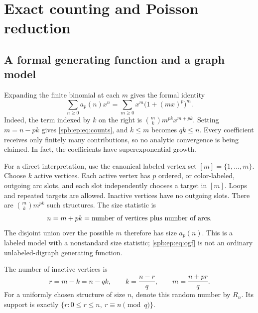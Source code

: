 \section{Exact counting and Poisson reduction}
\label{spb:ep:sec:exact}
\subsection{A formal generating function and a graph model}
Expanding the finite binomial at each $m$ gives the formal identity
\begin{equation}\label{spb:ep:eq:ogf}
 \sum_{n\ge0}a_p(n)x^n
       =\sum_{m\ge0}x^m\bigl(1+(mx)^p\bigr)^m.
\end{equation}
Indeed, the term indexed by $k$ on the right is
$\binom mk m^{pk}x^{m+pk}$. Setting $m=n-pk$ gives
\eqref{spb:ep:eq:counts}, and $k\le m$ becomes $qk\le n$.
Every coefficient receives only finitely many contributions, so no analytic
convergence is being claimed. In fact, the coefficients have superexponential
growth.

For a direct interpretation, use the canonical labeled vertex set
$[m]=\{1,\ldots,m\}$. Choose $k$ active vertices. Each active vertex has $p$
ordered, or color-labeled, outgoing arc slots, and each slot independently
chooses a target in $[m]$. Loops and repeated targets are allowed.
Inactive vertices have no outgoing slots. There are
$\binom mk m^{pk}$ such structures. The size statistic is
\[
 n=m+pk=\hbox{number of vertices plus number of arcs}.
\]
The disjoint union over the possible $m$ therefore has size $a_p(n)$.
This is a labeled model with a nonstandard size statistic;
\eqref{spb:ep:eq:ogf} is not an ordinary unlabeled-digraph generating function.

The number of inactive vertices is
\begin{equation}\label{spb:ep:eq:rdef}
 r=m-k=n-qk,\qquad
 k=\frac{n-r}{q},\qquad m=\frac{n+pr}{q}.
\end{equation}
For a uniformly chosen structure of size $n$, denote this random number by
$R_n$. Its support is exactly
$\{r:0\le r\le n,\ r\equiv n\pmod q\}$.

